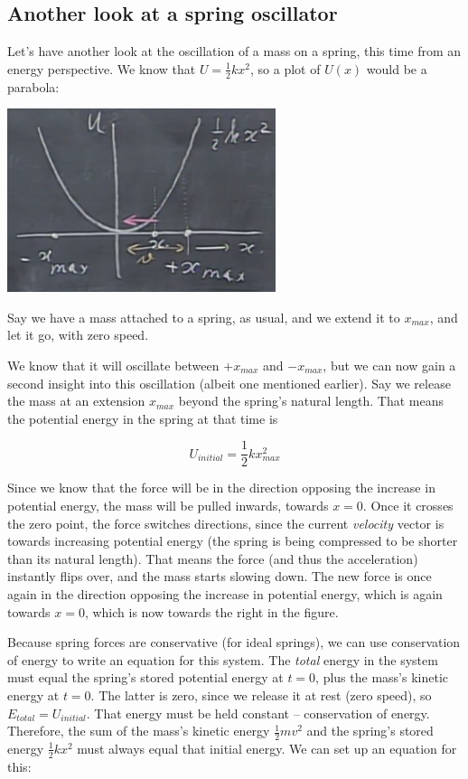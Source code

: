 \documentclass[8.01x]{subfiles}
\begin{document}
\subsection{Another look at a spring oscillator}

Let's have another look at the oscillation of a mass on a spring, this time from an energy perspective. We know that $\displaystyle U = \frac{1}{2} k x^2$, so a plot of $U(x)$ would be a parabola:

\begin{center}
\includegraphics[scale=0.8]{Graphics/lec13_spring_pe}
\end{center}

Say we have a mass attached to a spring, as usual, and we extend it to $x_{max}$, and let it go, with zero speed.

We know that it will oscillate between $+x_{max}$ and $-x_{max}$, but we can now gain a second insight into this oscillation (albeit one mentioned earlier). Say we release the mass at an extension $x_{max}$ beyond the spring's natural length. That means the potential energy in the spring at that time is

\begin{equation}
U_{initial} = \frac{1}{2} k x_{max}^2
\end{equation}

Since we know that the force will be in the direction opposing the increase in potential energy, the mass will be pulled inwards, towards $x = 0$. Once it crosses the zero point, the force switches directions, since the current \emph{velocity} vector is towards increasing potential energy (the spring is being compressed to be shorter than its natural length). That means the force (and thus the acceleration) instantly flips over, and the mass starts slowing down. The new force is once again in the direction opposing the increase in potential energy, which is again towards $x = 0$, which is now towards the right in the figure.

Because spring forces are conservative (for ideal springs), we can use conservation of energy to write an equation for this system. The \emph{total} energy in the system must equal the spring's stored potential energy at $t = 0$, plus the mass's kinetic energy at $t = 0$. The latter is zero, since we release it at rest (zero speed), so $E_{total} = U_{initial}$. That energy must be held constant -- conservation of energy. Therefore, the sum of the mass's kinetic energy $\displaystyle \frac{1}{2} m v^2$ and the spring's stored energy $\displaystyle \frac{1}{2} k x^2$ must always equal that initial energy. We can set up an equation for this:
\end{document}
